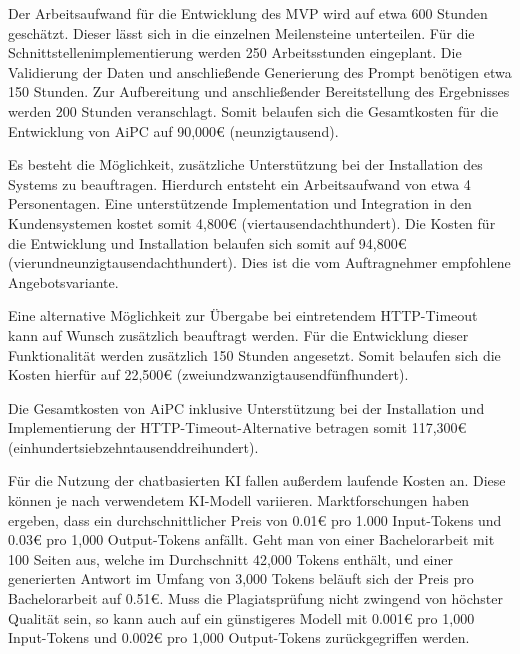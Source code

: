 Der Arbeitsaufwand für die Entwicklung des \ac{MVP} wird auf etwa 600 Stunden geschätzt.
Dieser lässt sich in die einzelnen Meilensteine unterteilen.
Für die Schnittstellenimplementierung werden 250 Arbeitsstunden eingeplant.
Die Validierung der Daten und anschließende Generierung des Prompt benötigen etwa 150 Stunden.
Zur Aufbereitung und anschließender Bereitstellung des Ergebnisses werden 200 Stunden veranschlagt.
Somit belaufen sich die Gesamtkosten für die Entwicklung von \ac{AiPC} auf 90,000\euro{} (neunzigtausend).

Es besteht die Möglichkeit, zusätzliche Unterstützung bei der Installation des Systems zu beauftragen.
Hierdurch entsteht ein Arbeitsaufwand von etwa 4 Personentagen.
Eine unterstützende Implementation und Integration in den Kundensystemen kostet somit 4,800\euro{} (viertausendachthundert).
Die Kosten für die Entwicklung und Installation belaufen sich somit auf 94,800\euro{} (vierundneunzigtausendachthundert).
Dies ist die vom Auftragnehmer empfohlene Angebotsvariante.

Eine alternative Möglichkeit zur Übergabe bei eintretendem HTTP-Timeout kann auf Wunsch zusätzlich beauftragt werden.
Für die Entwicklung dieser Funktionalität werden zusätzlich 150 Stunden angesetzt.
Somit belaufen sich die Kosten hierfür auf 22,500\euro{} (zweiundzwanzigtausendfünfhundert).

Die Gesamtkosten von \ac{AiPC} inklusive Unterstützung bei der Installation und Implementierung der HTTP-Timeout-Alternative betragen somit 117,300\euro{} (einhundertsiebzehntausenddreihundert).

Für die Nutzung der chatbasierten \ac{KI} fallen außerdem laufende Kosten an.
Diese können je nach verwendetem \ac{KI}-Modell variieren.
Marktforschungen haben ergeben, dass ein durchschnittlicher Preis von 0.01\euro{} pro 1.000 Input-Tokens und 0.03\euro{} pro 1,000 Output-Tokens anfällt.
Geht man von einer Bachelorarbeit mit 100 Seiten aus, welche im Durchschnitt 42,000 Tokens enthält, und einer generierten Antwort im Umfang von 3,000 Tokens beläuft sich der Preis pro Bachelorarbeit auf 0.51\euro{}.
Muss die Plagiatsprüfung nicht zwingend von höchster Qualität sein, so kann auch auf ein günstigeres Modell mit 0.001\euro{} pro 1,000 Input-Tokens und 0.002\euro{} pro 1,000 Output-Tokens zurückgegriffen werden.
